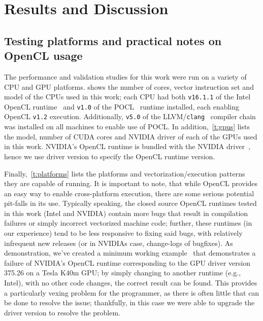 \documentclass[12pt,number,sort&compress,preprint]{elsarticle}
\begin{document}
\section{Results and Discussion}
\subsection{Testing platforms and practical notes on OpenCL usage}

The performance and validation studies for this work were run on a variety of CPU and GPU platforms.
 shows the number of cores, vector instruction set and model of the CPUs used in this work; each CPU had both \texttt{v16.1.1} of the Intel OpenCL runtime~\cite{intelopencl:2018} and \texttt{v1.0} of the POCL~\cite{poclIJPP} runtime installed, each enabling OpenCL \texttt{v1.2} execution.
Additionally, \texttt{v5.0} of the LLVM\slash\texttt{clang}~\cite{Lattner:2004:LCF:977395.977673} compiler chain was installed on all machines to enable use of POCL.
In addition,~\cref{t:gpus} lists the model, number of CUDA cores and NVIDIA driver of each of the GPUs used in this work.
NVIDIA's OpenCL runtime is bundled with the NVIDIA driver~\cite{NVIDIA:2018}, hence we use driver version to specify the OpenCL runtime version.

Finally,~\cref{t:platforms} lists the platforms and vectorization\slash execution patterns they are capable of running.
It is important to note, that while OpenCL provides an easy way to enable cross-platform execution, there are some serious potential pit-falls in its use.
Typically speaking, the closed source OpenCL runtimes tested in this work (Intel and NVIDIA) contain more bugs that result in compilation failures or simply incorrect vectorized machine code; further, these runtimes (in our experience) tend to be less responsive to fixing said bugs, with relatively infrequent new releases (or in NVIDIAs case, change-logs of bugfixes).
As demonstration, we've created a minimum working example~\cite{nvidia_mwe} that demonstrates a failure of NVIDIA's OpenCL runtime corresponding to the GPU driver version \num{375.26} on a Tesla K40m GPU; by simply changing to another runtime (e.g., Intel), with no other code changes, the correct result can be found.
This provides a particularly vexing problem for the programmer, as there is often little that can be done to resolve the issue; thankfully, in this case we were able to upgrade the driver version to resolve the problem.
\end{document}
